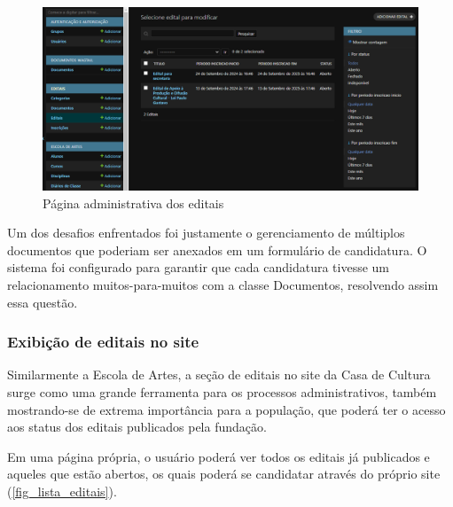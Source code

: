 \begin{figure}[htb]
	\caption{\label{fig_admin_editais}Página administrativa dos editais}
	\begin{center}
	    \includegraphics[scale=0.5]{./img/admin_edital.png}
	\end{center}
\end{figure}


Um dos desafios enfrentados foi justamente o gerenciamento de múltiplos documentos que poderiam ser anexados em um formulário de candidatura. O sistema foi configurado para garantir que cada candidatura tivesse um relacionamento muitos-para-muitos com a classe Documentos, resolvendo assim essa questão.

\subsubsection{Exibição de editais no site}

Similarmente a Escola de Artes, a seção de editais no site da Casa de Cultura surge como uma grande ferramenta para os processos administrativos, também mostrando-se de extrema importância para a população, que poderá ter o acesso aos status dos editais publicados pela fundação.

Em uma página própria, o usuário poderá ver todos os editais já publicados e aqueles que estão abertos, os quais poderá se candidatar através do próprio site (\autoref{fig_lista_editais}).

